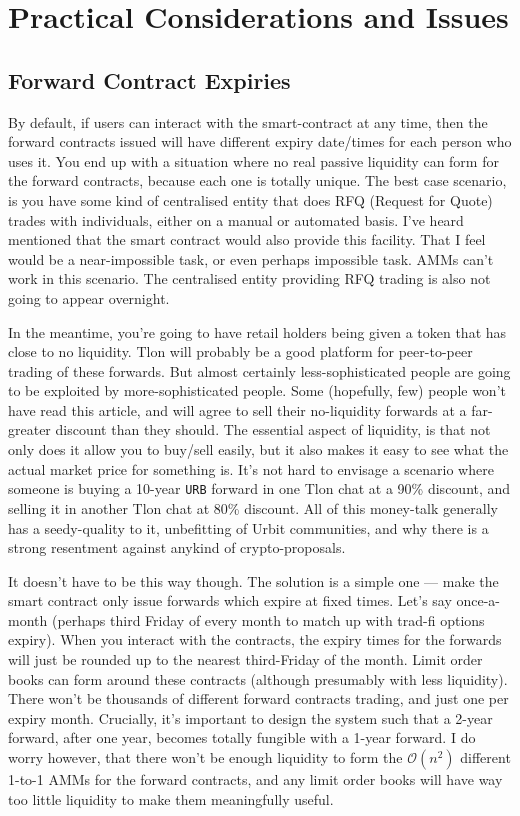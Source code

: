 \documentclass{article}
\begin{document}
	\section{Practical Considerations and Issues}
	\subsection{Forward Contract Expiries}
	By default, if users can interact with the smart-contract at any time, then the forward contracts issued will have different expiry date/times for each person who uses it. You end up with a situation where no real passive liquidity can form for the forward contracts, because each one is totally unique. The best case scenario, is you have some kind of centralised entity that does RFQ (Request for Quote) trades with individuals, either on a manual or automated basis. I've heard mentioned that the smart contract would also provide this facility. That I feel would be a near-impossible task, or even perhaps impossible task. AMMs can't work in this scenario. The centralised entity providing RFQ trading is also not going to appear overnight.
	
	 In the meantime, you're going to have retail holders being given a token that has close to no liquidity. Tlon will probably be a good platform for peer-to-peer trading of these forwards. But almost certainly less-sophisticated people are going to be exploited by more-sophisticated people. Some (hopefully, few) people won't have read this article, and will agree to sell their no-liquidity forwards at a far-greater discount than they should. The essential aspect of liquidity, is that not only does it allow you to buy/sell easily, but it also makes it easy to see what the actual market price for something is. It's not hard to envisage a scenario where someone is buying a 10-year \texttt{URB} forward in one Tlon chat at a 90\% discount, and selling it in another Tlon chat at 80\% discount. All of this money-talk generally has a seedy-quality to it, unbefitting of Urbit communities, and why there is a strong resentment against anykind of crypto-proposals.
	
	It doesn't have to be this way though. The solution is a simple one --- make the smart contract only issue forwards which expire at fixed times. Let's say once-a-month (perhaps third Friday of every month to match up with trad-fi options expiry). When you interact with the contracts, the expiry times for the forwards will just be rounded up to the nearest third-Friday of the month. Limit order books can form around these contracts (although presumably with less liquidity). There won't be thousands of different forward contracts trading, and just one per expiry month. Crucially, it's important to design the system such that a 2-year forward, after one year, becomes totally fungible with a 1-year forward. I do worry however, that there won't be enough liquidity to form the $\mathcal{O}(n^2)$ different 1-to-1 AMMs for the forward contracts, and any limit order books will have way too little liquidity to make them meaningfully useful.
	
\end{document}
